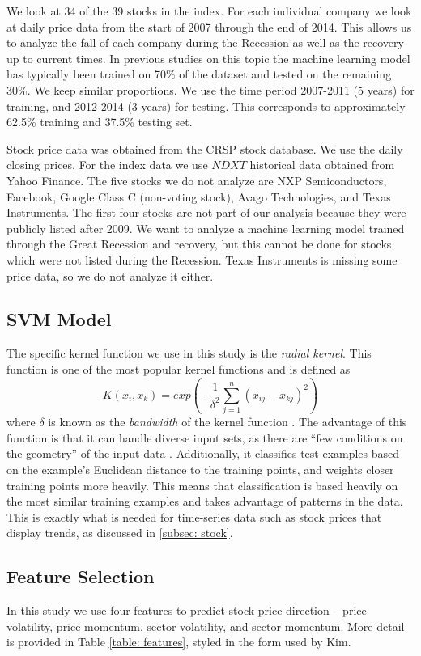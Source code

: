 \documentclass[pageno]{jpaper}
\begin{document}
We look at 34 of the 39 stocks in the index. For each individual company we look at daily price data from the start of 2007 through the end of 2014. This allows us to analyze the fall of each company during the Recession as well as the recovery up to current times. In previous studies on this topic the machine learning model has typically been trained on 70\% of the dataset and tested on the remaining 30\%. We keep similar proportions. We use the time period 2007-2011 (5 years) for training, and 2012-2014 (3 years) for testing. This corresponds to approximately 62.5\% training and 37.5\% testing set.

Stock price data was obtained from the CRSP stock database. We use the daily closing prices. For the index data we use $NDXT$ historical data obtained from Yahoo Finance. The five stocks we do not analyze are NXP Semiconductors, Facebook, Google Class C (non-voting stock), Avago Technologies, and Texas Instruments. The first four stocks are not part of our analysis because they were publicly listed after 2009. We want to analyze a machine learning model trained through the Great Recession and recovery, but this cannot be done for stocks which were not listed during the Recession. Texas Instruments is missing some price data, so we do not analyze it either.

\subsection{SVM Model}

The specific kernel function we use in this study is the {\em radial kernel}. This function is one of the most popular kernel functions and is defined as 
$$K(x_i, x_k) = exp\left(-\frac{1}{\delta^2}\sum_{j=1}^n(x_{ij}-x_{kj})^2\right)$$
where $\delta$ is known as the {\em bandwidth} of the kernel function \cite{kim}. The advantage of this function is that it can handle diverse input sets, as there are ``few conditions on the geometry'' of the input data \cite{buhmann}. Additionally, it classifies test examples based on the example's Euclidean distance to the training points, and weights closer training points more heavily. This means that classification is based heavily on the most similar training examples and takes advantage of patterns in the data. This is exactly what is needed for time-series data such as stock prices that display trends, as discussed in \ref{subsec: stock}.

\subsection{Feature Selection}
In this study we use four features to predict stock price direction -- price volatility, price momentum, sector volatility, and sector momentum. More detail is provided in Table \ref{table: features}, styled in the form used by Kim\cite{kim}.
\end{document}
